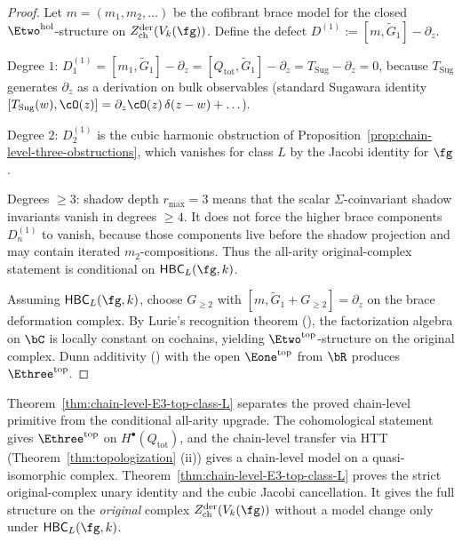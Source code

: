 \begin{proof}
Let $m = (m_1, m_2, \ldots)$ be the cofibrant brace model for
the closed $\Etwo^{\mathrm{hol}}$-structure on
$Z^{\mathrm{der}}_{\mathrm{ch}}(V_k(\fg))$. Define the defect
$D^{(1)} := [m, \widetilde G_1] - \partial_z$.

Degree $1$: $D^{(1)}_1 = [m_1, \widetilde G_1] - \partial_z
= [Q_{\mathrm{tot}}, \widetilde G_1] - \partial_z
= T_{\mathrm{Sug}} - \partial_z = 0$, because $T_{\mathrm{Sug}}$
generates $\partial_z$ as a derivation on bulk observables
(standard Sugawara identity $[T_{\mathrm{Sug}}(w), \cO(z)]
= \partial_z \cO(z)\,\delta(z-w) + \ldots$).

Degree $2$: $D^{(1)}_2$ is the cubic harmonic obstruction of
Proposition~\ref{prop:chain-level-three-obstructions}, which
vanishes for class $L$ by the Jacobi identity for $\fg$.

Degrees $\ge 3$: shadow depth $r_{\max}=3$ means that the
scalar $\Sigma$-coinvariant shadow invariants vanish in degrees
$\ge4$. It does not force the higher brace components
$D^{(1)}_n$ to vanish, because those components live before the
shadow projection and may contain iterated $m_2$-compositions.
Thus the all-arity original-complex statement is conditional on
$\mathsf{HBC}_L(\fg,k)$.

Assuming $\mathsf{HBC}_L(\fg,k)$, choose $G_{\geq2}$ with
$[m,\widetilde G_1+G_{\geq2}]=\partial_z$ on the brace
deformation complex. By Lurie's recognition theorem
(\cite[Thm 5.4.5.9]{HA}), the factorization algebra on $\bC$ is
locally constant on cochains, yielding
$\Etwo^{\mathrm{top}}$-structure on the original complex. Dunn
additivity (\cite[Thm 5.1.2.2]{HA}) with the open
$\Eone^{\mathrm{top}}$ from $\bR$ produces
$\Ethree^{\mathrm{top}}$.
\end{proof}

\begin{remark}
\label{rem:chain-vs-coh-sharp}
Theorem~\ref{thm:chain-level-E3-top-class-L} separates the proved
chain-level primitive from the conditional all-arity upgrade. The
cohomological statement gives $\Ethree^{\mathrm{top}}$ on
$H^\bullet(Q_{\mathrm{tot}})$, and the chain-level transfer via
HTT (Theorem~\ref{thm:topologization} (ii)) gives a chain-level
model on a quasi-isomorphic complex. Theorem~\ref{thm:chain-level-E3-top-class-L}
proves the strict original-complex unary identity and the cubic
Jacobi cancellation. It gives the full structure on the
\emph{original} complex
$Z^{\mathrm{der}}_{\mathrm{ch}}(V_k(\fg))$ without a model change
only under $\mathsf{HBC}_L(\fg,k)$.
\end{remark}

